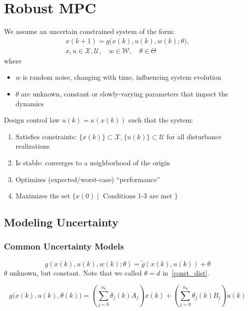 \section{Robust MPC}
We assume an uncertain constrained system of the form:
\begin{gather*}
    x(k + 1) = g\bigl(x(k), u(k), w(k); \theta\bigr),\\
    x, u \in \mathcal{X}, \mathcal{U}, \quad w \in \mathcal{W}, \quad \theta \in \Theta
\end{gather*}
where
\begin{itemize}
    \item $w$ is random noise, changing with time, influencing system evolution
    \item $\theta$ are unknown, constant or slowly-varying parameters that impact the dynamics
\end{itemize}
\newpar{}

Design control law $u(k) = \kappa(x(k))$ such that the system:
\begin{enumerate}
    \item Satisfies constraints: $\{x(k)\} \subset \mathcal{X}, \{u(k)\} \subset \mathcal{U}$ for all disturbance realizations
    \item Is stable: converges to a neighborhood of the origin
    \item Optimizes (expected/worst-case) ``performance''
    \item Maximizes the set $\{x(0) \mid \text{ Conditions 1-3 are met }\}$
\end{enumerate}

\subsection{Modeling Uncertainty}
\subsubsection{Common Uncertainty Models}
\noindent
\begin{equation*}
    g(x(k), u(k), w(k); \theta) = \widetilde{g}(x(k), u(k)) + \theta
\end{equation*}
$\theta$ unknown, but constant. Note that we called $\theta = d$ in~\ref{const_dist}.

\newpar{}
\noindent
{\small
    \begin{equation*}
        g\bigl(x(k), u(k), \theta(k)\bigr) =
        \left( \sum_{j=0}^{n_\theta} \theta_j(k) A_j \right)x(k) +
        \left( \sum_{j=0}^{n_\theta} \theta_j(k) B_j \right)u(k)
    \end{equation*}
}

